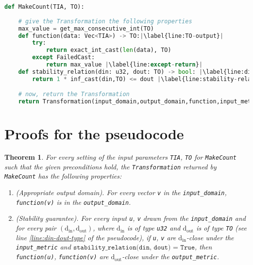 \documentclass[12pt,letterpaper]{article}
\newcommand{\din}{\mathrm{d_{in}}}
\newcommand{\dout}{\mathrm{d_{out}}}
\newtheorem{theorem}{Theorem}[section]
\theoremstyle{definition}
\begin{document}
\begin{lstlisting}[language = Python, escapechar=|]
def MakeCount(TIA, TO):
    
    # give the Transformation the following properties
    max_value = get_max_consecutive_int(TO) 
    def function(data: Vec<TIA>) -> TO:|\label{line:TO-output}|
        try:
            return exact_int_cast(len(data), TO)
        except FailedCast:
            return max_value |\label{line:except-return}|
    def stability_relation(din: u32, dout: TO) -> bool: |\label{line:din-dout-type}|
        return 1 * inf_cast(din,TO) <= dout |\label{line:stability-relation}|

    # now, return the Transformation
    return Transformation(input_domain,output_domain,function,input_metric,output_metric,stability_relation)

\end{lstlisting}

\section{Proofs for the pseudocode}

\begin{theorem}
\label{thrm:domain-and-stability}
    For every setting of the input parameters \texttt{TIA}, \texttt{TO} for \texttt{MakeCount} such that the given preconditions hold, the \texttt{Transformation} returned by \texttt{MakeCount} has the following properties:
    \begin{enumerate}
        \item \textup{(Appropriate output domain).} For every vector \texttt{v} in the \texttt{input\_domain}, \texttt{function(v)} is in the \texttt{output\_domain}.
        
        \item \textup{(Stability guarantee).} For every input \texttt{u}, \texttt{v} drawn from the \texttt{input\_domain} and for every pair $(\din, \dout)$, where $\din$ is of type \texttt{u32} and $\dout$ is of type \texttt{TO} (see line \ref{line:din-dout-type} of the pseudocode), if \texttt{u}, \texttt{v} are $\din$-close under the \texttt{input\_metric} and $\texttt{stability\_relation(din, dout) = True}$, then \texttt{function(u)}, \texttt{function(v)} are $\dout$-close under the \texttt{output\_metric}.
    \end{enumerate}
\end{theorem}
\end{document}
